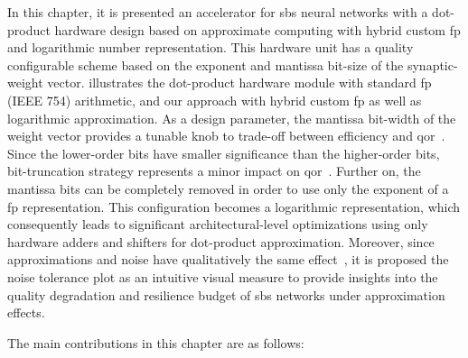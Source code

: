 In this chapter, it is presented an accelerator for \gls{sbs} neural networks with a dot-product hardware design based on approximate computing with hybrid custom \gls{fp}  and logarithmic number representation. This hardware unit has a quality configurable scheme based on the exponent and mantissa bit-size of the synaptic-weight vector.  illustrates the dot-product hardware module with standard \gls{fp} (IEEE 754) arithmetic, and our approach with hybrid custom \gls{fp}  as well as logarithmic approximation. As a design parameter, the mantissa bit-width of the weight vector provides a tunable knob to trade-off between efficiency and \gls{qor}~\cite{park2009dynamic, han2013approximate}. Since the lower-order bits have smaller significance than the higher-order bits, bit-truncation strategy represents a minor impact on \gls{qor}~\cite{gupta2011impact, mittal2016survey}. Further on, the mantissa bits can be completely removed in order to use only the exponent of a \gls{fp} representation. This configuration becomes a logarithmic representation, which consequently leads to significant architectural-level optimizations using only hardware adders and shifters for dot-product approximation. Moreover, since approximations and noise have qualitatively the same effect~\cite{venkataramani2015approximate}, it is proposed the noise tolerance plot as an intuitive visual measure to provide insights into the quality degradation and resilience budget of \gls{sbs} networks under approximation effects.

The main contributions in this chapter are as follows:

